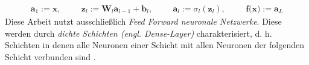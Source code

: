 \begin{align}
    \label{formular:general_knn}
    \textbf{a}_1 := \textbf{x}, \hspace{1cm}
    \textbf{z}_l := \textbf{W}_l\textbf{a}_{l-1} + \textbf{b}_l, \hspace{1cm}
    \textbf{a}_l := \sigma_l(\textbf{z}_l), \hspace{1cm} \textbf{f(x)} := \textbf{a}_L
\end{align}
Diese Arbeit nutzt ausschließlich \textit{Feed Forward neuronale Netzwerke}.
Diese werden durch \textit{dichte Schichten (engl. Dense-Layer)} charakterisiert, d. h. Schichten in denen alle Neuronen
einer Schicht mit allen Neuronen der folgenden Schicht verbunden sind \cite{bengio2017deep}.





